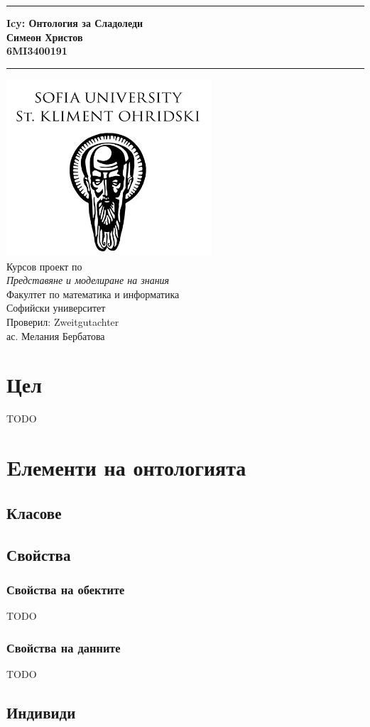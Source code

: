 \documentclass[12pt]{article}
\newcommand{\JMUTitle}[9]{

  \thispagestyle{empty}
  \vspace*{\stretch{1}}
  {\parindent0cm
  \rule{\linewidth}{.7ex}}
  \begin{flushright}
    \vspace*{\stretch{1}}
    \sffamily\bfseries\Huge
    #1\\
    \vspace*{\stretch{1}}
    \sffamily\bfseries\large
    #2\\
    \vspace*{\stretch{1}}
    \sffamily\bfseries\small
    #3
  \end{flushright}
  \rule{\linewidth}{.7ex}

  \vspace*{\stretch{1}}
  \begin{center}
    \includegraphics[width=3in]{./images/logo.png} \\
    \vspace*{\stretch{1}}
    \Large Курсов проект по \\ \textit{Представяне и моделиране на знания} \\

    \vspace*{\stretch{2}}
    \large Факултет по математика и информатика\\
    \large Софийски университет\\
    
    \vspace*{\stretch{1}}
    \large Проверил:  #8 \\[1mm]
    
    \vspace*{\stretch{1}}
    \large #7 \\

  \end{center}
}
\begin{document}
  

  \JMUTitle
      {Icy: Онтология за Сладоледи}
      {Симеон Христов}
      {6MI3400191}
      
      {Wirtschaftswissenschaftlichen Fakultät}  %
      {W"urzburg 2018}                          %
      {Януари 2023}                              %
      {ас. Мелания Бербатова}               %
      {Zweitgutachter}                          %

  \clearpage

\tableofcontents

\clearpage




\section{Цел} 

TODO





\section{Eлементи на онтологията}

\subsection{Класове}

\subsection{Свойства}

\subsubsection{Свойства на обектите}

TODO

\subsubsection{Свойства на данните}

TODO




\subsection{Индивиди}
\end{document}
